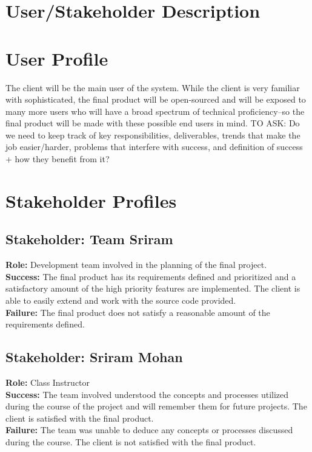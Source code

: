\documentclass{article}
\begin{document}
\section{User/Stakeholder Description}

\section{User Profile}
The client will be the main user of the system.  While the client is very familiar with sophisticated, the final product will be open-sourced and will be exposed to many more users who will have a broad spectrum of technical proficiency--so the final product will be made with these possible end users in mind.
TO ASK: Do we need to keep track of key responsibilities, deliverables, trends that make the job easier/harder, problems that interfere with success, and definition of success + how they benefit from it?

\section{Stakeholder Profiles}

\subsection{Stakeholder: Team Sriram}
\textbf{Role:} Development team involved in the planning of the final project.\\
\textbf{Success:} The final product has its requirements defined and prioritized and a satisfactory amount of the high priority features are implemented.  The client is able to easily extend and work with the source code provided.\\
\textbf{Failure:} The final product does not satisfy a reasonable amount of the requirements defined.

\subsection{Stakeholder: Sriram Mohan}
\textbf{Role:} Class Instructor\\
\textbf{Success:} The team involved understood the concepts and processes utilized during the course of the project and will remember them for future projects. The client is satisfied with the final product.\\
\textbf{Failure:} The team was unable to deduce any concepts or processes discussed during the course. The client is not satisfied with the final product.
\end{document}
